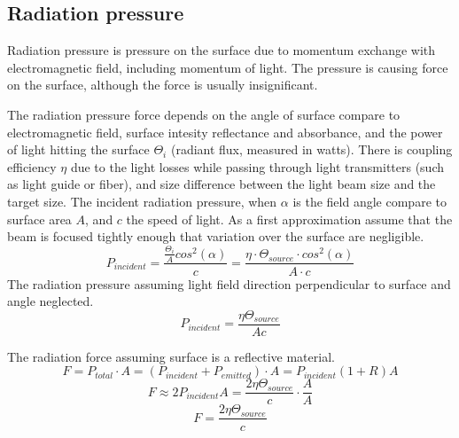 \documentclass[\main/master.tex]{subfiles}
\begin{document}
\newpage
\subsection{Radiation pressure}

Radiation pressure is pressure on the surface due to momentum exchange with electromagnetic field, including momentum of light. The pressure is causing force on the surface, although the force is usually insignificant.  
\par
The radiation pressure force depends on the angle of surface compare to electromagnetic field, surface intesity reflectance and absorbance, and the power of light hitting the surface $\Theta_i$ (radiant flux, measured in watts). There is coupling efficiency $\eta$ due to the light losses while passing through light transmitters (such as light guide or fiber), and size difference between the light beam size and the target size. The incident radiation pressure, when $\alpha$ is the field angle compare to surface area $A$, and $c$ the speed of light. As a first approximation assume that the beam is focused tightly enough that variation over the surface are negligible. 
\begin{equation}
P_{incident} = \frac{\frac{\Theta_i}{A}cos^2(\alpha)}{c} = \frac{\eta\cdot \Theta_{source}\cdot cos^2(\alpha)}{{A\cdot c}} \label{eqn:radiation_pressure}
\end{equation}
The radiation pressure assuming light field direction perpendicular to surface and angle neglected. 
\begin{equation}
P_{incident} = \frac{\eta\Theta_{source}}{{Ac}} \label{eqn:radiation_pressure_perpendicular}
\end{equation}

The radiation force assuming surface is a reflective material.
\begin{equation}
F = P_{total}\cdot A = (P_{incident}+P_{emitted})\cdot A = P_{incident}(1+R)A \label{eqn:radiation_force}
\end{equation}
\begin{equation}
F \approx 2P_{incident}A = \frac{2\eta\Theta_{source}}{{c}}\cdot \frac{A}{A} \label{eqn:radiation_force_reflective}
\end{equation}
\begin{equation}
F = \frac{2\eta\Theta_{source}}{{c}} \label{eqn:radiation_force_power}
\end{equation}




\newpage
\end{document}
